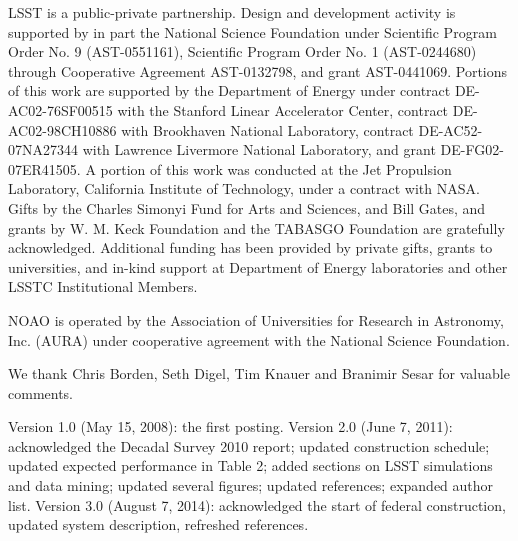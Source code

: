 \documentclass{emulateapj}
\begin{document}
LSST is a public-private partnership.  Design and development activity is
supported by in part the National Science Foundation under Scientific
Program Order No. 9 (AST-0551161), Scientific Program Order No. 1
(AST-0244680) through Cooperative Agreement AST-0132798, and grant AST-0441069. 
Portions of this work are supported by the Department of Energy under contract
DE-AC02-76SF00515 with the Stanford Linear Accelerator Center, contract
DE-AC02-98CH10886 with Brookhaven National Laboratory, contract
DE-AC52-07NA27344 with Lawrence Livermore National Laboratory, and grant
DE-FG02-07ER41505. A portion of this work was conducted at the Jet Propulsion 
Laboratory, California Institute of Technology, under a contract with NASA.
Gifts by the Charles Simonyi Fund for Arts and Sciences,
and Bill Gates, and grants by W. M. Keck Foundation and the TABASGO Foundation
are gratefully acknowledged. Additional funding has been provided by private gifts, grants 
to universities, and in-kind support at Department of Energy laboratories and other 
LSSTC Institutional Members.  

NOAO is operated by the Association of Universities for Research in Astronomy,
Inc. (AURA) under cooperative agreement with the National Science Foundation.

We thank Chris Borden, Seth Digel, Tim Knauer and Branimir Sesar for valuable 
comments.



\vskip 0.06in
Version 1.0 (May 15, 2008): the first posting. 
\vskip 0.06in
Version 2.0 (June 7, 2011): acknowledged the Decadal Survey 2010 report; updated construction schedule;
updated expected performance in Table 2; added sections on LSST simulations and data mining;
updated several figures; updated references; expanded author list. 
\vskip 0.06in
Version 3.0 (August 7, 2014): acknowledged the start of federal construction, 
updated system description, refreshed references. 
\end{document}

